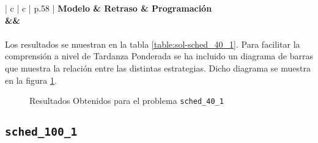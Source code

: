 \documentclass[spanish]{article}
\begin{document}
			\begin{table}
				\centering
				\begin{tabu}{ | c | c | p{.58\linewidth} |}
					\hline
					\bfseries Modelo & \bfseries Retraso & \bfseries Programación
					{\\\hline\model&\delay&\schedule}
					\\\hline
				\end{tabu}
				\caption{Resultados Obtenidos para el problema \texttt{sched\_40\_1}}
				\label{table:sol-sched_40_1}
			\end{table}

			\paragraph{}
			Los resultados se muestran en la tabla \ref{table:sol-sched_40_1}. Para facilitar la comprensión a nivel de Tardanza Ponderada se ha incluido un diagrama de barras que muestra la relación entre las distintas estrategias. Dicho diagrama se muestra en la figura \ref{plot:sol-sched_40_1}.


			\begin{figure}
				\begin{center}
				\end{center}
				\caption{Resultados Obtenidos para el problema \texttt{sched\_40\_1}}
				\label{plot:sol-sched_40_1}
			\end{figure}

		\subsection{\texttt{sched\_100\_1}}
\end{document}
